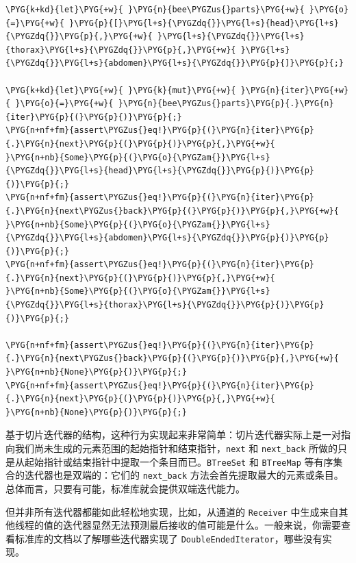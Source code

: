 \begin{Verbatim}[commandchars=\\\{\},breaklines=true,breakanywhere=true,fontsize=\codefont,xleftmargin=17bp]
\PYG{k+kd}{let}\PYG{+w}{ }\PYG{n}{bee\PYGZus{}parts}\PYG{+w}{ }\PYG{o}{=}\PYG{+w}{ }\PYG{p}{[}\PYG{l+s}{\PYGZdq{}}\PYG{l+s}{head}\PYG{l+s}{\PYGZdq{}}\PYG{p}{,}\PYG{+w}{ }\PYG{l+s}{\PYGZdq{}}\PYG{l+s}{thorax}\PYG{l+s}{\PYGZdq{}}\PYG{p}{,}\PYG{+w}{ }\PYG{l+s}{\PYGZdq{}}\PYG{l+s}{abdomen}\PYG{l+s}{\PYGZdq{}}\PYG{p}{]}\PYG{p}{;}

\PYG{k+kd}{let}\PYG{+w}{ }\PYG{k}{mut}\PYG{+w}{ }\PYG{n}{iter}\PYG{+w}{ }\PYG{o}{=}\PYG{+w}{ }\PYG{n}{bee\PYGZus{}parts}\PYG{p}{.}\PYG{n}{iter}\PYG{p}{(}\PYG{p}{)}\PYG{p}{;}
\PYG{n+nf+fm}{assert\PYGZus{}eq!}\PYG{p}{(}\PYG{n}{iter}\PYG{p}{.}\PYG{n}{next}\PYG{p}{(}\PYG{p}{)}\PYG{p}{,}\PYG{+w}{      }\PYG{n+nb}{Some}\PYG{p}{(}\PYG{o}{\PYGZam{}}\PYG{l+s}{\PYGZdq{}}\PYG{l+s}{head}\PYG{l+s}{\PYGZdq{}}\PYG{p}{)}\PYG{p}{)}\PYG{p}{;}
\PYG{n+nf+fm}{assert\PYGZus{}eq!}\PYG{p}{(}\PYG{n}{iter}\PYG{p}{.}\PYG{n}{next\PYGZus{}back}\PYG{p}{(}\PYG{p}{)}\PYG{p}{,}\PYG{+w}{ }\PYG{n+nb}{Some}\PYG{p}{(}\PYG{o}{\PYGZam{}}\PYG{l+s}{\PYGZdq{}}\PYG{l+s}{abdomen}\PYG{l+s}{\PYGZdq{}}\PYG{p}{)}\PYG{p}{)}\PYG{p}{;}
\PYG{n+nf+fm}{assert\PYGZus{}eq!}\PYG{p}{(}\PYG{n}{iter}\PYG{p}{.}\PYG{n}{next}\PYG{p}{(}\PYG{p}{)}\PYG{p}{,}\PYG{+w}{      }\PYG{n+nb}{Some}\PYG{p}{(}\PYG{o}{\PYGZam{}}\PYG{l+s}{\PYGZdq{}}\PYG{l+s}{thorax}\PYG{l+s}{\PYGZdq{}}\PYG{p}{)}\PYG{p}{)}\PYG{p}{;}

\PYG{n+nf+fm}{assert\PYGZus{}eq!}\PYG{p}{(}\PYG{n}{iter}\PYG{p}{.}\PYG{n}{next\PYGZus{}back}\PYG{p}{(}\PYG{p}{)}\PYG{p}{,}\PYG{+w}{ }\PYG{n+nb}{None}\PYG{p}{)}\PYG{p}{;}
\PYG{n+nf+fm}{assert\PYGZus{}eq!}\PYG{p}{(}\PYG{n}{iter}\PYG{p}{.}\PYG{n}{next}\PYG{p}{(}\PYG{p}{)}\PYG{p}{,}\PYG{+w}{      }\PYG{n+nb}{None}\PYG{p}{)}\PYG{p}{;}
\end{Verbatim}

基于切片迭代器的结构，这种行为实现起来非常简单：切片迭代器实际上是一对指向我们尚未生成的元素范围的起始指针和结束指针，\texttt{next} 和 \texttt{next\_back} 所做的只是从起始指针或结束指针中提取一个条目而已。\texttt{BTreeSet} 和 \texttt{BTreeMap} 等有序集合的迭代器也是双端的：它们的 \texttt{next\_back} 方法会首先提取最大的元素或条目。总体而言，只要有可能，标准库就会提供双端迭代能力。

但并非所有迭代器都能如此轻松地实现，比如，从通道的 \texttt{Receiver} 中生成来自其他线程的值的迭代器显然无法预测最后接收的值可能是什么。一般来说，你需要查看标准库的文档以了解哪些迭代器实现了 \texttt{DoubleEndedIterator}，哪些没有实现。


